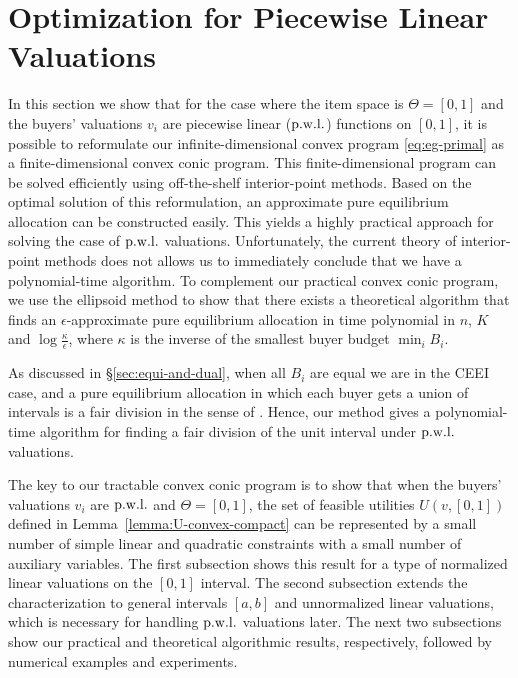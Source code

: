 \section{Optimization for Piecewise Linear Valuations} \label{sec:convex-opt-for-pwl}
In this section we show that for the case where the item space is $\Theta = [0,1]$ and the buyers' valuations $v_i$ are piecewise linear (${\rm p.w.l.}$) functions on $[0,1]$, it is possible to reformulate our infinite-dimensional convex program \eqref{eq:eg-primal} as a finite-dimensional convex conic program. 
This finite-dimensional program can be solved efficiently using off-the-shelf interior-point methods.
Based on the optimal solution of this reformulation, an approximate pure equilibrium allocation can be constructed easily.
This yields a highly practical approach for solving the case of ${\rm p.w.l.}$ valuations.
Unfortunately, the current theory of interior-point methods does not allows us to immediately conclude that we have a polynomial-time algorithm.
To complement our practical convex conic program, we use the ellipsoid method to 
show that there exists a theoretical algorithm that finds an $\epsilon$-approximate pure equilibrium allocation in time polynomial in $n$, $K$ and $\log \frac{\kappa}{\epsilon}$, where $\kappa$ is the inverse of the smallest buyer budget $\min_i B_i$.

As discussed in \S\ref{sec:equi-and-dual}, when all $B_i$ are equal we are in the CEEI case, and  a pure equilibrium allocation in which each buyer gets a union of intervals is a fair division in the sense of \citep{weller1985fair}. 
Hence, our method gives a polynomial-time algorithm for finding a fair division of the unit interval under ${\rm p.w.l.}$ valuations.

The key to our tractable convex conic program is to show that when the buyers' valuations $v_i$ are ${\rm p.w.l.}$ and $\Theta = [0,1]$, the set of feasible utilities $U(v, [0,1])$ defined in Lemma~\ref{lemma:U-convex-compact} can be represented by a small number of simple linear and quadratic constraints with a small number of auxiliary variables.
The first subsection shows this result for a type of normalized linear valuations on the $[0,1]$ interval. The second subsection extends the characterization to general intervals $[a,b]$ and unnormalized linear valuations, which is necessary for handling ${\rm p.w.l.}$ valuations later. 
The next two subsections show our practical and theoretical algorithmic results, respectively, followed by numerical examples and experiments.

